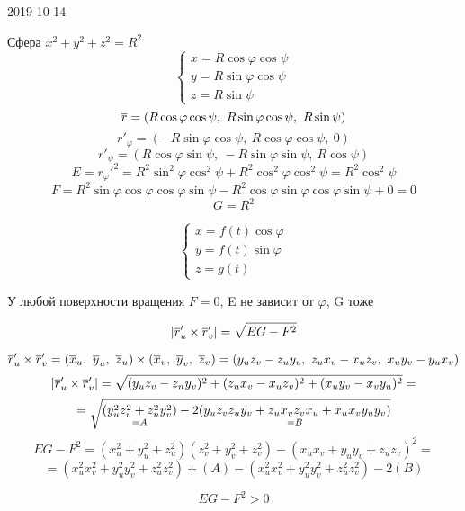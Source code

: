 \documentclass[main]{subfiles}
\begin{document}
\begin{lect} {2019-10-14}

	  \begin{example}
	    Сфера $x^2 + y^2 + z^2 = R^2$
	    \[\begin{cases}
	      x = R \cos\varphi \cos\psi\\
	      y = R \sin\varphi \cos\psi\\
	      z = R \sin\psi
	    \end{cases}\]
	    \[\overline{r} = (R \cos\varphi \cos\psi,\ R\sin\varphi \cos\psi,\ R \sin\psi)\]
	    \[r'_{\varphi} = (-R \sin\varphi \cos\psi,\ R\cos\varphi \cos\psi,\ 0)\]
	    \[r'_{\psi} = (R \cos\varphi \sin\psi,\ -R\sin\varphi \sin\psi,\ R \cos\psi)\]
	    \[E = r_{\varphi}'^2 = R^2 \sin^2 \varphi \cos^2 \psi + R^2 \cos^2 \varphi \cos^2 \psi = R^2 \cos^2 \psi\]
	    \[F = R^2 \sin\varphi \cos\varphi\cos\varphi\sin\psi - R^2 \cos\varphi \sin\varphi \cos\varphi \sin\psi + 0 = 0\]
	    \[G = R^2\]
	  \end{example}

	  \begin{Example} 
	    \[\begin{cases}
	      x = f(t) \cos\varphi\\
	      y = f(t) \sin\varphi\\
	      z = g(t)
	    \end{cases}\]
	\end{Example}

	  \begin{upr}
	    У любой поверхности вращения $F=0$, E не зависит от $\varphi$, G тоже
	  \end{upr}

	  \begin{Theorem}
	    \[|\overline{r}'_u \times \overline{r}'_v| = \sqrt{EG-F^2}\]
	  \end{Theorem}

	  \begin{Proof}
	    \[\ol{r}_u' \times \ol{r}_v' = (\ol{x}_u,\ \ol{y}_u,\ \ol{z}_u) \times (\ol{x}_v,\ \ol{y}_v,\ \ol{z}_v) = (y_u z_v - z_u y_v,\ z_u x_v - x_u z_v,\ x_u y_v - y_u x_v)\]
	    \[|\overline{r}_u' \times \overline{r}_v'| = \sqrt{(y_u z_v - z_n y_v)^2 + (z_u x_v - x_u z_v)^2 + (x_u y_v - x_v y_u)^2} = \]
	    \[= \sqrt{\underset{=A}{(y_u^2 z_v^2 + z_n^2 y_v^2)} - 2 \underset{=B}{(y_u z_v z_u y_v + z_u x_v z_v x_u + x_u x_v y_u y_v)}}\]
	    \[EG-F^2 = (x_u^2 + y_u^2 + z_u^2)(z_v^2 + y_v^2 + z_v^2) - (x_u x_v + y_u y_v + z_u z_v)^2 =\]
	    \[= (x_u^2 x_v^2 + y_u^2 y_v^2 + z_u^2 z_v^2) + (A)-(x_u^2 x_v^2 + y_u^2 y_v^2 + z_u^2 z_v^2) - 2(B)\]
	  \end{Proof}

	  \begin{Consequence}
	    \[EG-F^2 > 0\]
	  \end{Consequence}
	\end{lect}
\end{document}
